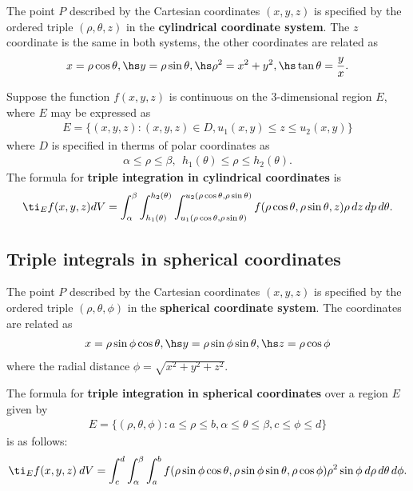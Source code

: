 \documentclass{article}
\begin{document}
\begin{definition}
	The point $P$ described by the Cartesian coordinates $(x,y,z)$ is specified by the
	ordered triple $(\rho,\theta,z)$ in the \textbf{cylindrical coordinate system}. The
	$z$ coordinate is the same in both systems, the other coordinates are related as
	\begin{align*}
		x=\rho\cos\theta,\hs y=\rho\sin\theta,\hs
		\rho^2 = x^2+y^2,\hs\tan\theta = \frac{y}{x}.
	\end{align*}
\end{definition}
\begin{theorem}
	Suppose the function $f(x,y,z)$ is continuous on the 3-dimensional region $E$, where $E$
	may be expressed as
	\begin{align*}
		E=\{(x,y,z) : (x,y,z) \in D, u_1(x,y) \leq z \leq u_2(x,y)\}
	\end{align*}
	where $D$ is specified in therms of polar coordinates as
	\begin{align*}
		\alpha \leq \rho \leq \beta,\:\: h_1(\theta) \leq \rho \leq h_2(\theta).
	\end{align*}
	The formula for \textbf{triple integration in cylindrical coordinates} is
	\begin{align*}
		\ti_E f(x,y,z) dV = \int_\alpha^\beta \int_{h_1(\theta)}^{h_2(\theta)}
		\int_{u_1(\rho\cos\theta,\rho\sin\theta)}^{u_2(\rho\cos\theta,\rho\sin\theta)}
		f(\rho\cos\theta,\rho\sin\theta,z)\rho\,dz\,dp\,d\theta.
	\end{align*}
\end{theorem}


\subsection{Triple integrals in spherical coordinates}


\begin{definition}
	The point $P$ described by the Cartesian coordinates $(x,y,z)$ is specified by the ordered
	triple $(\rho,\theta,\phi)$ in the \textbf{spherical coordinate system}. The coordinates are
	related as
	\begin{align*}
		x=\rho\sin\phi\cos\theta,\hs y = \rho \sin\phi\sin\theta,\hs z = \rho\cos\phi
	\end{align*}
	where the radial distance $\phi=\sqrt{x^2+y^2+z^2}$.
\end{definition}
\begin{theorem}
	The formula for \textbf{triple integration in spherical coordinates} over a region $E$
	given by
	\begin{align*}
		E=\{(\rho,\theta,\phi):a\leq\rho\leq b,\alpha\leq\theta\leq\beta, c\leq\phi\leq d\}
	\end{align*}
	is as follows:
	\begin{align*}
		\ti_E f(x,y,z)\:dV = \int_c^d \int_\alpha^\beta \int_a^b f(\rho\sin\phi\cos\theta,\rho\sin\phi\sin\theta,\rho\cos\phi)\rho^2\sin\phi\:d\rho\,d\theta\,d\phi.
	\end{align*}
\end{theorem}
\end{document}
